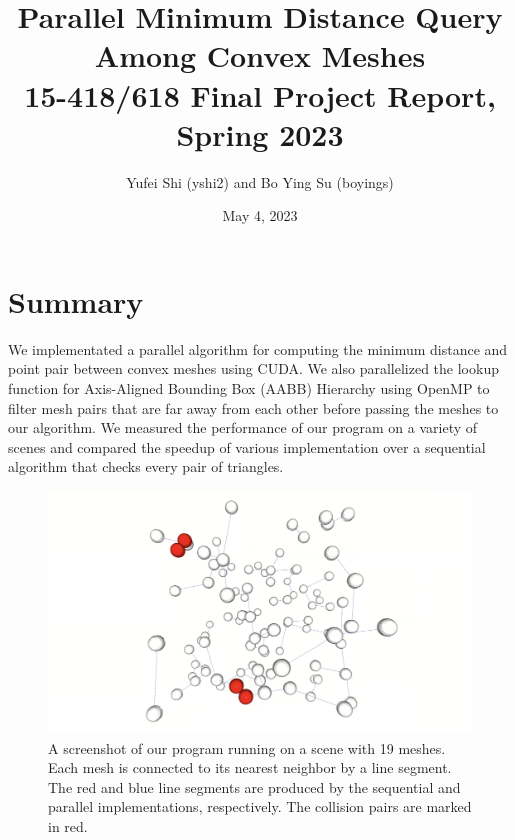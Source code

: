 \documentclass[12pt,fleqn]{article}
\title{%
    Parallel Minimum Distance Query Among Convex Meshes \\
    \Large 15-418/618 Final Project Report, Spring 2023}
\author{Yufei Shi (yshi2) and Bo Ying Su (boyings)}
\date{May 4, 2023}
\begin{document}
\maketitle



\section{Summary}
We implementated a parallel algorithm for computing the minimum distance and point pair between convex meshes using CUDA. We also parallelized the lookup function for Axis-Aligned Bounding Box (AABB) Hierarchy using OpenMP to filter mesh pairs that are far away from each other before passing the meshes to our algorithm.
We measured the performance of our program on a variety of scenes and compared the speedup of various implementation over a sequential algorithm that checks every pair of triangles.


\begin{figure}[ht!]
    \centering
    \includegraphics[width=1.0\textwidth]{figs/cover_new.png}
    \caption{%
            A screenshot of our program running on a scene with 19 meshes.
            Each mesh is connected to its nearest neighbor by a line segment.
            The red and blue line segments are produced by the sequential and parallel implementations, respectively.
            The collision pairs are marked in red.}
\end{figure}



\end{document}
